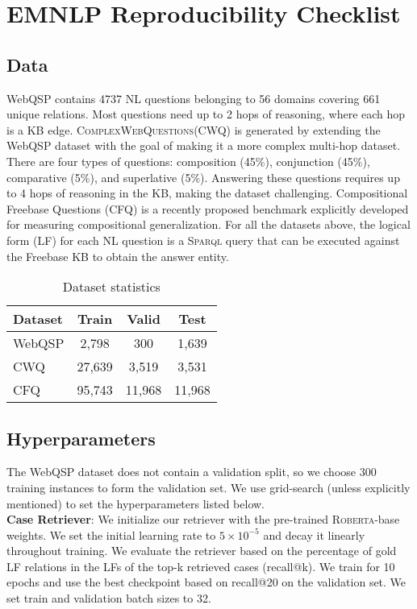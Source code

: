 \documentclass[11pt]{article}
\newcommand{\roberta}{\textsc{Roberta}\xspace}
\newcommand{\cwq}{\textsc{ComplexWebQuestions}\xspace}
\begin{document}
\appendix

\clearpage

\section{EMNLP Reproducibility Checklist}
\label{sec:appendix_data_hyper_param}
\subsection{Data}
\label{sub:appendix_data}
WebQSP contains 4737 NL questions belonging to 56 domains covering 661 unique relations. Most questions need up to 2 hops of reasoning, where each hop is a KB edge. \cwq (CWQ) is generated by extending the WebQSP dataset with the goal of making it a more complex multi-hop dataset. There are four types of questions: composition (45\%), conjunction (45\%), comparative (5\%), and superlative (5\%). Answering these questions requires up to 4 hops of reasoning in the KB, making the dataset challenging. Compositional Freebase Questions (CFQ) is a recently proposed benchmark explicitly developed for measuring compositional generalization. For all the datasets above, the logical form (LF) for each NL question is a \textsc{Sparql} query that can be executed against the Freebase KB to obtain the answer entity.

\begin{table}[]
    \centering
    \begin{tabular}{l c c c}\toprule
         Dataset & Train & Valid & Test \\\midrule
         WebQSP & 2,798 & 300 & 1,639\\
         CWQ & 27,639 & 3,519 & 3,531 \\
         CFQ & 95,743 & 11,968 & 11,968 \\\bottomrule
         
    \end{tabular}
    \caption{Dataset statistics}
    \label{tab:data_stats}
\end{table}

\subsection{Hyperparameters}
\label{sub:appendix_hyperparam}

The WebQSP dataset does not contain a validation split, so we choose 300 training instances to form the validation set. We use grid-search (unless explicitly mentioned) to set the hyperparameters listed below.\\
\noindent\textbf{Case Retriever}: We initialize our retriever with the pre-trained \roberta-base weights. We set the initial learning rate to $5 \times 10^{-5}$ and decay it linearly throughout training. We evaluate the retriever based on the percentage of gold LF relations in the LFs of the top-k retrieved cases (recall@k). We train for 10 epochs and use the best checkpoint based on recall@20 on the validation set. We set train and validation batch sizes to 32.
\end{document}
